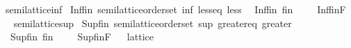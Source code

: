 \begin{isabellebody}
\isamarkupfalse%
\ semilattice{\isacharunderscore}{\kern0pt}inf\isanewline
{}\isanewline
\isanewline
{}\isamarkupfalse%
\ Inf{\isacharunderscore}{\kern0pt}fin{\isacharcolon}{\kern0pt}\ semilattice{\isacharunderscore}{\kern0pt}order{\isacharunderscore}{\kern0pt}set\ inf\ less{\isacharunderscore}{\kern0pt}eq\ less\isanewline
{}\isanewline
\ \ Inf{\isacharunderscore}{\kern0pt}fin\ {\isacharparenleft}{\kern0pt}{\isachardoublequoteopen}{\isasymSqinter}\isactrlsub f\isactrlsub i\isactrlsub n\ {\isacharunderscore}{\kern0pt}{\isachardoublequoteclose}\ {\isacharbrackleft}{\kern0pt}{}{}{}{\isacharbrackright}{\kern0pt}\ {}{}{}{\isacharparenright}{\kern0pt}\ {\isacharequal}{\kern0pt}\ Inf{\isacharunderscore}{\kern0pt}fin{\isachardot}{\kern0pt}F%
\isadelimproof
\ %
\endisadelimproof
%
\isatagproof
\isacommand{{\isachardot}{\kern0pt}{\isachardot}{\kern0pt}}\isamarkupfalse%
%
\endisatagproof
{\isafoldproof}%
%
\isadelimproof
%
\endisadelimproof
\isanewline
\isanewline
{}\isamarkupfalse%
\isanewline
\isanewline
{}\isamarkupfalse%
\ semilattice{\isacharunderscore}{\kern0pt}sup\isanewline
{}\isanewline
\isanewline
{}\isamarkupfalse%
\ Sup{\isacharunderscore}{\kern0pt}fin{\isacharcolon}{\kern0pt}\ semilattice{\isacharunderscore}{\kern0pt}order{\isacharunderscore}{\kern0pt}set\ sup\ greater{\isacharunderscore}{\kern0pt}eq\ greater\isanewline
{}\isanewline
\ \ Sup{\isacharunderscore}{\kern0pt}fin\ {\isacharparenleft}{\kern0pt}{\isachardoublequoteopen}{\isasymSqunion}\isactrlsub f\isactrlsub i\isactrlsub n\ {\isacharunderscore}{\kern0pt}{\isachardoublequoteclose}\ {\isacharbrackleft}{\kern0pt}{}{}{}{\isacharbrackright}{\kern0pt}\ {}{}{}{\isacharparenright}{\kern0pt}\ {\isacharequal}{\kern0pt}\ Sup{\isacharunderscore}{\kern0pt}fin{\isachardot}{\kern0pt}F%
\isadelimproof
\ %
\endisadelimproof
%
\isatagproof
\isacommand{{\isachardot}{\kern0pt}{\isachardot}{\kern0pt}}\isamarkupfalse%
%
\endisatagproof
{\isafoldproof}%
%
\isadelimproof
%
\endisadelimproof
\isanewline
\isanewline
{}\isamarkupfalse%
%
\isadelimdocument
%
\endisadelimdocument
%
\isatagdocument
%
\isamarkuptrue%
%
\endisatagdocument
{\isafolddocument}%
%
\isadelimdocument
%
\endisadelimdocument
{}\isamarkupfalse%
\ lattice\isanewline

\end{isabellebody}
